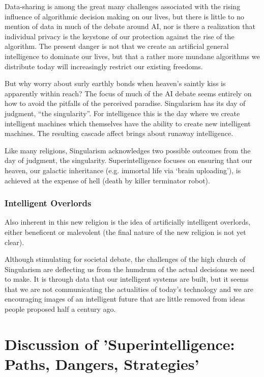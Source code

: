 \documentclass[a4paper]{caesar_book}
\let\oldchapter\chapter
\def\chapter{%
  \setcounter{footnote}{0}%
  \oldchapter
}
\begin{document}
Data-sharing is among the great many challenges associated with the rising influence of algorithmic decision making on our lives, but there is little to no mention of data in much of the debate around AI, nor is there a realization that individual privacy is the keystone of our protection against the rise of the algorithm. The present danger is not that we create an artificial general intelligence to dominate our lives, but that a rather more mundane algorithms we distribute today will increasingly restrict our existing freedoms.

But why worry about surly earthly bonds when heaven’s saintly kiss is apparently within reach? The focus of much of the AI debate seems entirely on how to avoid the pitfalls of the perceived paradise. Singularism has its day of judgment, “the singularity”. For intelligence this is the day where we create intelligent machines which themselves have the ability to create new intelligent machines. The resulting cascade affect brings about runaway intelligence.

Like many religions, Singularism acknowledges two possible outcomes from the day of judgment, the singularity. Superintelligence focuses on ensuring that our heaven, our galactic inheritance (e.g. immortal life via ‘brain uploading’), is achieved at the expense of hell (death by killer terminator robot).

\subsection{Intelligent Overlords}

Also inherent in this new religion is the idea of artificially intelligent overlords, either beneficent or malevolent (the final nature of the new religion is not yet clear).

Although stimulating for societal debate, the challenges of the high church of Singularism are deflecting us from the humdrum of the actual decisions we need to make. It is through data that our intelligent systems are built, but it seems that we are not communicating the actualities of today’s technology and we are encouraging images of an intelligent future that are little removed from ideas people proposed half a century ago.



\chapter{Discussion of 'Superintelligence:\\Paths, Dangers, Strategies'}
\end{document}
